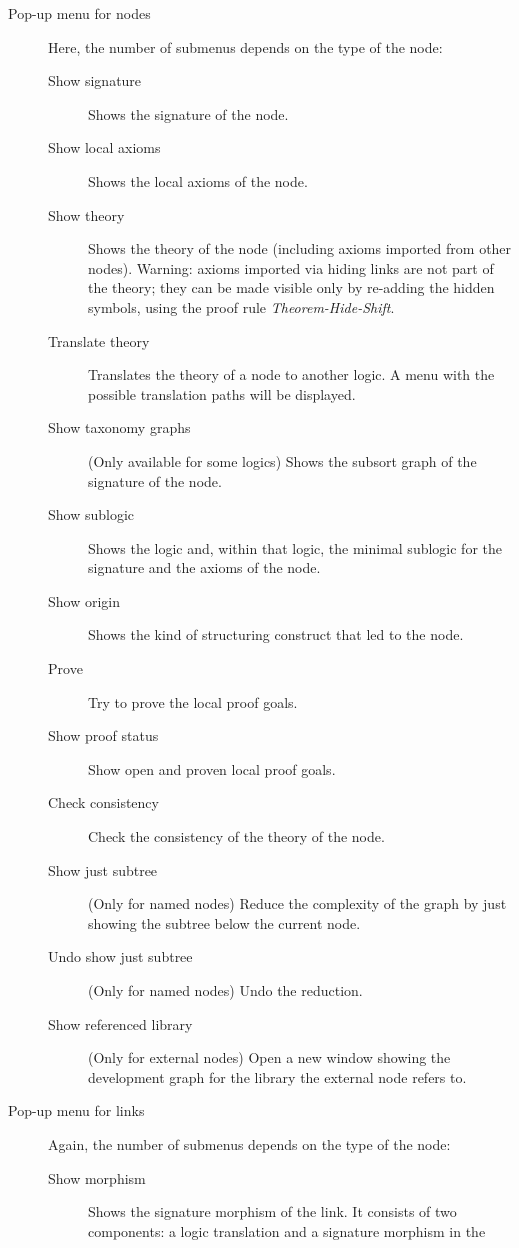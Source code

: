 \documentclass{article}
\begin{document}
\begin{description}
\begin{description}
\end{description}
\item[Pop-up menu for nodes]
Here, the number of submenus depends on the type of the node:
\begin{description}
\item[Show signature] Shows the signature of the node.
\item[Show local axioms] Shows the local axioms of the node.
\item[Show theory] Shows the theory of the node (including axioms
imported from other nodes). Warning: axioms imported via hiding  links
are not part of the theory; they can be made visible only by re-adding
the hidden symbols, using the proof rule \emph{Theorem-Hide-Shift}.
\item[Translate theory] Translates the theory of a node to another logic.
A menu with the possible translation paths will be displayed.
\item[Show taxonomy graphs] (Only available for some logics) Shows the subsort graph of the signature of the node.
\item[Show sublogic] Shows the logic and, within that logic, the minimal sublogic
for the signature and the axioms of the node.
\item[Show origin] Shows the kind of \CASL structuring construct that
led to the node.
\item[Prove] Try to prove the local proof goals.
\item[Show proof status] Show open and proven local proof goals.
\item[Check consistency] Check the consistency of the theory of the node.
\item[Show just subtree] (Only for named nodes) Reduce the complexity
of the graph by just showing the subtree below the current node.
\item[Undo show just subtree] (Only for named nodes) Undo the reduction.
\item[Show referenced library] (Only for external nodes) Open a new window
showing the development graph for the library the external node refers to.
\end{description}
\item[Pop-up menu for links]
Again, the number of submenus depends on the type of the node:
\begin{description}
\item[Show morphism] Shows the signature morphism of the link. It consists
of two components: a logic translation and a signature morphism in the

\end{description}
\end{description}
\end{document}
